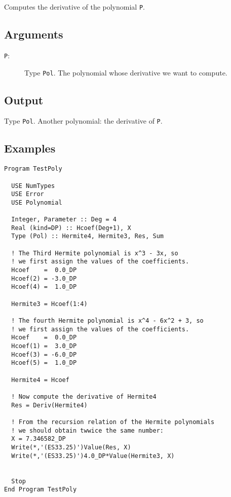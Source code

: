 Computes the derivative of the polynomial \texttt{P}.

\subsection{Arguments}

\begin{description}
\item[\texttt{P}:] Type \texttt{Pol}. The polynomial whose derivative
  we want to compute.
\end{description}

\subsection{Output}

Type \texttt{Pol}. Another polynomial: the derivative of \texttt{P}.

\subsection{Examples}

\begin{lstlisting}[emph=Deriv,
                   emphstyle=\color{blue},
                   frame=trBL,
                   caption=Computing the derivative of a polynomial.,
                   label=derivpol]
Program TestPoly

  USE NumTypes
  USE Error
  USE Polynomial

  Integer, Parameter :: Deg = 4
  Real (kind=DP) :: Hcoef(Deg+1), X
  Type (Pol) :: Hermite4, Hermite3, Res, Sum

  ! The Third Hermite polynomial is x^3 - 3x, so
  ! we first assign the values of the coefficients.
  Hcoef    =  0.0_DP
  Hcoef(2) = -3.0_DP
  Hcoef(4) =  1.0_DP

  Hermite3 = Hcoef(1:4)

  ! The fourth Hermite polynomial is x^4 - 6x^2 + 3, so
  ! we first assign the values of the coefficients.
  Hcoef    =  0.0_DP
  Hcoef(1) =  3.0_DP
  Hcoef(3) = -6.0_DP
  Hcoef(5) =  1.0_DP

  Hermite4 = Hcoef

  ! Now compute the derivative of Hermite4
  Res = Deriv(Hermite4)

  ! From the recursion relation of the Hermite polynomials 
  ! we should obtain twwice the same number:
  X = 7.346582_DP
  Write(*,'(ES33.25)')Value(Res, X)
  Write(*,'(ES33.25)')4.0_DP*Value(Hermite3, X)
  

  Stop
End Program TestPoly
\end{lstlisting}

